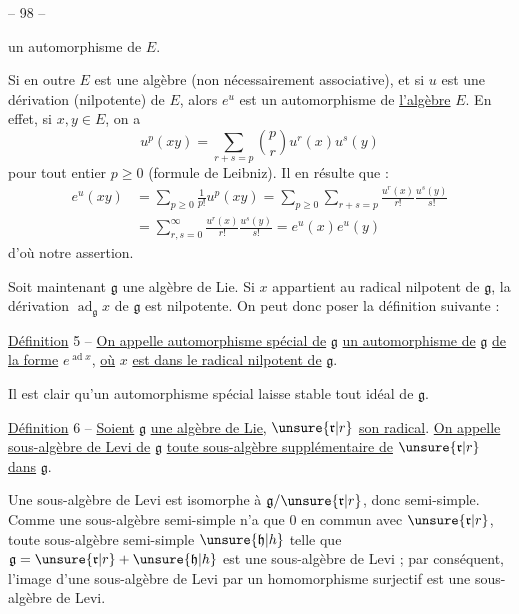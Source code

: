 
\begin{center}-- 98 --\end{center}

un automorphisme de $E$.

Si en outre $E$ est une algèbre (non nécessairement associative), et si $u$ est une dérivation (nilpotente) de $E$, alors $e^u$ est un automorphisme de \uline{l'algèbre} $E$. En effet, si $x,y\in E$, on a
\[
u^p(xy)=\sum_{r+s=p}\binom{p}{r}u^r(x)u^s(y)
\]
pour tout entier $p\geq0$ (formule de Leibniz). Il en résulte que :
\[
\begin{aligned}
e^u(xy)&=\sum_{p\geq0}\frac{1}{p!}u^p(xy)=\sum_{p\geq0}\sum_{r+s=p}\frac{u^r(x)}{r!}\frac{u^s(y)}{s!}\\
&=\sum_{r,s=0}^\infty\frac{u^r(x)}{r!}\frac{u^s(y)}{s!}=e^u(x)e^u(y)
\end{aligned}
\]
d'où notre assertion.

Soit maintenant $\mathfrak g$ une algèbre de Lie. Si $x$ appartient au radical nilpotent de $\mathfrak g$, la dérivation $\operatorname{ad}_{\mathfrak g}x$ de $\mathfrak g$ est nilpotente. On peut donc poser la définition suivante :

\uline{Définition} 5 -- \uline{On appelle automorphisme spécial de} $\mathfrak g$ \uline{un automorphisme de} $\mathfrak g$ \uline{de la forme} $e^{\operatorname{ad}x}$, \uline{où} $x$ \uline{est dans le radical nilpotent de} $\mathfrak g$.

Il est clair qu'un automorphisme spécial laisse stable tout idéal de $\mathfrak g$.

\uline{Définition} 6 -- \uline{Soient} $\mathfrak g$ \uline{une algèbre de Lie}, $\unsure{\mathfrak r|r}$ \uline{son radical}. \uline{On appelle sous-algèbre de Levi de} $\mathfrak g$ \uline{toute sous-algèbre supplémentaire de} $\unsure{\mathfrak r|r}$ \uline{dans} $\mathfrak g$.

Une sous-algèbre de Levi est isomorphe à $\mathfrak g/\unsure{\mathfrak r|r}$, donc semi-simple. Comme une sous-algèbre semi-simple n'a que $0$ en commun avec $\unsure{\mathfrak r|r}$, toute sous-algèbre semi-simple $\unsure{\mathfrak h|h}$ telle que $\mathfrak g=\unsure{\mathfrak r|r}+\unsure{\mathfrak h|h}$ est une sous-algèbre de Levi ; par conséquent, l'image d'une sous-algèbre de Levi par un homomorphisme surjectif est une sous-algèbre de Levi.
